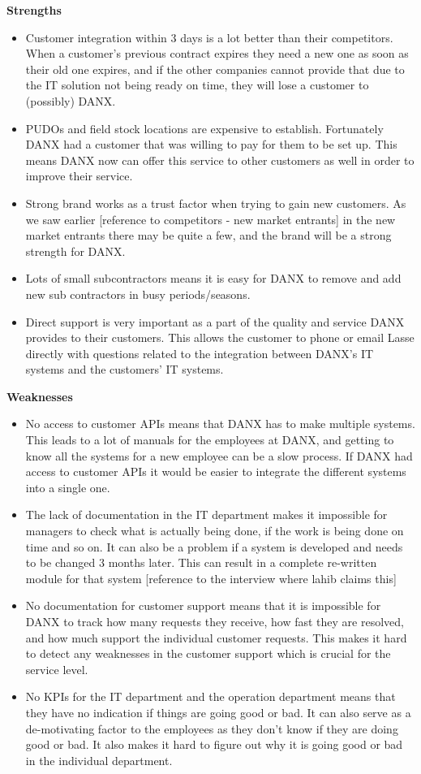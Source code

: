 \textbf{Strengths}
\begin{itemize}
\item Customer integration within 3 days is a lot better than their competitors. When a customer’s previous contract expires they need a new one as soon as their old one expires, and if the other companies cannot provide that due to the IT solution not being ready on time, they will lose a customer to (possibly) DANX.
\item PUDOs and field stock locations are expensive to establish. Fortunately DANX had a customer that was willing to pay for them to be set up. This means DANX now can offer this service to other customers as well in order to improve their service.
\item Strong brand works as a trust factor when trying to gain new customers. As we saw earlier [reference to competitors - new market entrants] in the new market entrants there may be quite a few, and the brand will be a strong strength for DANX.
\item Lots of small subcontractors means it is easy for DANX to remove and add new sub contractors in busy periods/seasons. 
\item Direct support is very important as a part of the quality and service DANX provides to their customers. This allows the customer to phone or email Lasse directly with questions related to the integration between DANX’s IT systems and the customers’ IT systems.
\end{itemize}

\textbf{Weaknesses}
\begin{itemize}
\item No access to customer APIs means that DANX has to make multiple systems. This leads to a lot of manuals for the employees at DANX, and getting to know all the systems for a new employee can be a slow process. If DANX had access to customer APIs it would be easier to integrate the different systems into a single one.
\item The lack of documentation in the IT department makes it impossible for managers to check what is actually being done, if the work is being done on time and so on.
It can also be a problem if a system is developed and needs to be changed 3 months later. This can result in a complete re-written module for that system [reference to the interview where lahib claims this]  
\item No documentation for customer support means that it is impossible for DANX to track how many requests they receive, how fast they are resolved, and how much support the individual customer requests.
This makes it hard to detect any weaknesses in the customer support which is crucial for the service level.
\item No KPIs for the IT department and the operation department means that they have no indication if things are going good or bad. It can also serve as a de-motivating factor to the employees as they don’t know if they are doing good or bad. It also makes it hard to figure out why it is going good or bad in the individual department.
\end{itemize}

